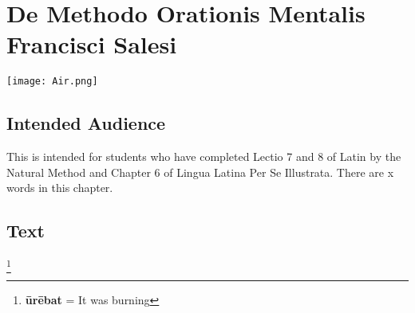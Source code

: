 \chapter{De Methodo Orationis Mentalis Francisci Salesi}
\begin{center}
\texttt{[image: Air.png]}
\end{center}

\section{Intended Audience}
This is intended for students who have completed Lectio 7 and 8 of Latin by the Natural Method and Chapter 6 of Lingua Latina Per Se Illustrata. There are x words in this chapter.

\section{Text}

\footnote{\textbf{ūrēbat} = It was burning}